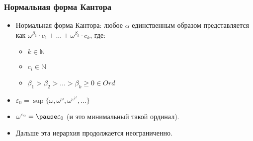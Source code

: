\documentclass[10pt]{beamer}
\begin{document}
\begin{frame}
    \frametitle{Нормальная форма Кантора}
    \begin{itemize}
        \item Нормальная форма Кантора: любое $\alpha$ единственным образом представляется как $\omega^{\beta_1} \cdot c_1 + \ldots + \omega^{\beta_k} \cdot c_k$, где:
        \begin{itemize}
            \item $k \in \mathbb{N}$
            \item $c_i \in \mathbb{N}$
            \item $\beta_1 > \beta_2 > \ldots > \beta_k \geq 0 \in Ord$
        \end{itemize}
        \pause
        \item $\varepsilon_0 = \sup \{\omega, \omega^\omega, \omega^{\omega^\omega}, \ldots\}$
        \item $\omega^{\varepsilon_0} = \pause \varepsilon_0$ (и это минимальный такой ординал).
        \item Дальше эта иерархия продолжается неограниченно.
    \end{itemize}
\end{frame}
\end{document}
